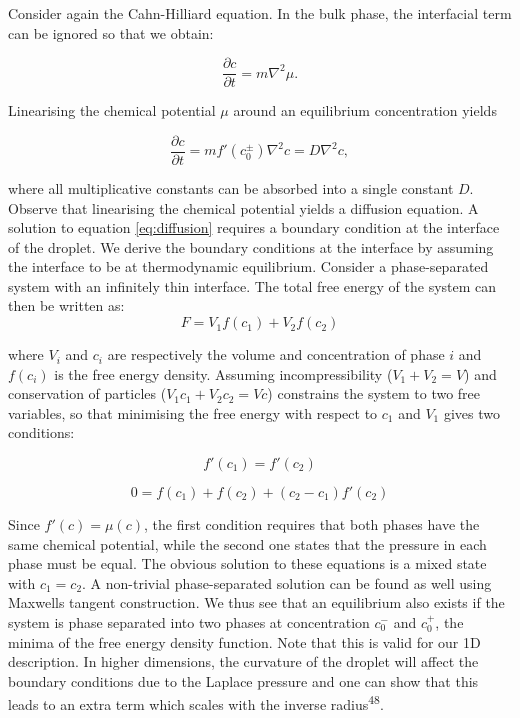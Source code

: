 \documentclass{Dissertate}
\begin{document}
Consider again the Cahn-Hilliard equation. In the bulk phase, the interfacial term can be ignored so that we obtain:

\begin{equation}
\label{eq:diffusion}
\frac{\partial c}{\partial t} = m\nabla^2\mu.
\end{equation}

Linearising the chemical potential $\mu$ around an equilibrium concentration yields

\begin{equation}
\frac{\partial c }{\partial t} = mf'(c_0^\pm)\nabla^2c = D\nabla^2c,
\label{eq:diffusion}
\end{equation}

where all multiplicative constants can be absorbed into a single constant $D$. Observe that linearising the chemical potential yields a diffusion equation. A solution to equation \ref{eq:diffusion} requires a boundary condition at the interface of the droplet. We derive the boundary conditions at the interface by assuming the interface to be at thermodynamic equilibrium. Consider a phase-separated system with an infinitely thin interface. The total free
energy of the system can then be written as: \[
F = V_1 f(c_1) + V_2 f(c_2)
\]

where \(V_i\) and \(c_i\) are respectively the volume and
concentration of phase \(i\) and \(f(c_i)\) is the free energy
density. Assuming incompressibility (\(V_1+V_2=V\)) and conservation of
particles (\(V_1c_1+V_2c_2=Vc\)) constrains the system to two
free variables, so that minimising the free energy with respect to
\(c_1\) and \(V_1\) gives two conditions:

\[
f'(c_1) = f'(c_2)
\]

\[
0 = f(c_1) + f(c_2) + (c_2-c_1)f'(c_2)
\]

Since \(f'(c) = \mu(c)\), the first condition requires that both
phases have the same chemical potential, while the second one
states that the pressure in each phase must be equal. The obvious solution
to these equations is a mixed state with \(c_1=c_2\). A
non-trivial phase-separated solution can be found as well using Maxwells tangent construction. We thus see that an equilibrium also exists if the system is phase separated into two phases at concentration $c_0^-$ and $c_0^+$, the minima of the free energy density function. Note that this is valid for our 1D description. In higher dimensions, the curvature of the droplet will affect the boundary conditions due to the Laplace pressure and one can show that this leads to an extra term which scales with the inverse radius\textsuperscript{48}.
\end{document}
